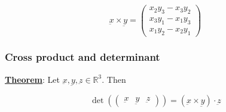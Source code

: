 \documentclass[10pt]{extarticle}
\newcommand{\R}{\mathbb{R}}
\newcommand{\munderbar}[1]{\underbar{\ensuremath{#1}}}
\begin{document}
$$
    \munderbar{x} \times \munderbar{y} = \begin{pmatrix}
        x_2 y_3 - x_3 y_2 \\
        x_3 y_1 - x_1 y_3 \\
        x_1 y_2 - x_2 y_1
    \end{pmatrix}
$$

\subsubsection{Cross product and determinant}

\textbf{\underline{Theorem}}: Let $\munderbar{x}, \munderbar{y}, \munderbar{z} \in \R^3$. Then

$$
    \det \left( \begin{pmatrix}
            \munderbar{x} & \munderbar{y} & \munderbar{z}
        \end{pmatrix} \right) = (\munderbar{x} \times \munderbar{y}) \cdot \munderbar{z}
$$
\end{document}
